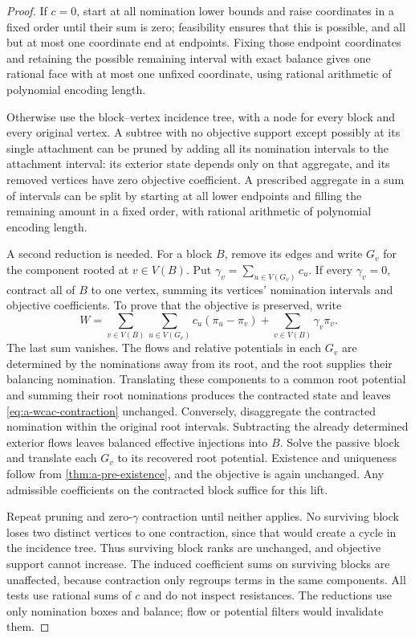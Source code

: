 \begin{proof}
If $c=0$, start at all nomination lower bounds and raise coordinates in a
fixed order until their sum is zero; feasibility ensures that this is
possible, and all but at most one coordinate end at endpoints. Fixing
those endpoint coordinates and retaining the possible remaining interval
with exact balance gives one rational face with at most one unfixed
coordinate, using rational arithmetic of polynomial encoding length.

Otherwise use the block--vertex incidence tree, with a node for every
block and every original vertex. A subtree with no objective support
except possibly at its single attachment can be pruned by adding all its
nomination intervals to the attachment interval: its exterior state
depends only on that aggregate, and its removed vertices have zero
objective coefficient. A prescribed aggregate in a sum of intervals can
be split by starting at all lower endpoints and filling the remaining
amount in a fixed order, with rational arithmetic of polynomial encoding
length.

A second reduction is needed. For a block $B$, remove its edges and
write $G_v$ for the component rooted at $v\in V(B)$. Put
$\gamma_v=\sum_{u\in V(G_v)}c_u$. If every $\gamma_v=0$, contract all of
$B$ to one vertex, summing its vertices' nomination intervals and objective
coefficients. To prove that the objective is preserved, write
\begin{equation}
 W=\sum_{v\in V(B)}\sum_{u\in V(G_v)}c_u(\pi_u-\pi_v)
       +\sum_{v\in V(B)}\gamma_v\pi_v.
 \label{eq:a-wcac-contraction}
\end{equation}
The last sum vanishes. The flows and relative potentials in each $G_v$
are determined by the nominations away from its root, and the root
supplies their balancing nomination. Translating these components to a
common root potential and summing their root nominations produces the
contracted state and leaves \eqref{eq:a-wcac-contraction} unchanged.
Conversely, disaggregate the contracted nomination within the original
root intervals. Subtracting the already determined exterior flows leaves
balanced effective injections into $B$. Solve the passive block and
translate each $G_v$ to its recovered root potential. Existence and
uniqueness follow from \cref{thm:a-pre-existence}, and the objective is
again unchanged. Any admissible coefficients on the contracted block
suffice for this lift.

Repeat pruning and zero-$\gamma$ contraction until neither applies.
No surviving block loses two distinct vertices to one contraction, since
that would create a cycle in the incidence tree. Thus surviving block
ranks are unchanged, and objective support cannot increase. The induced
coefficient sums on surviving blocks are unaffected, because contraction
only regroups terms in the same components. All tests use rational sums
of $c$ and do not inspect resistances. The reductions use only nomination
boxes and balance; flow or potential filters would invalidate them.


\end{proof}
